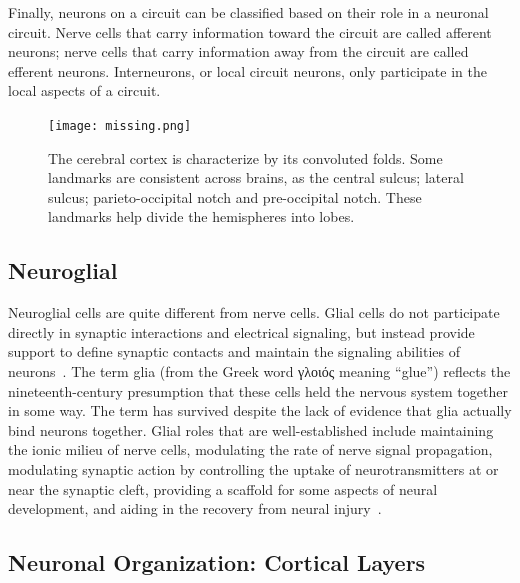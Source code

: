 Finally, neurons on a circuit can be classified based on their role in a 
neuronal circuit. Nerve cells that carry information toward the circuit are
called afferent neurons; nerve cells that carry information away from the 
circuit are called efferent neurons. Interneurons, or local circuit neurons,
only participate in the local aspects of a circuit.


\begin{figure}[t]
    \texttt{[image: missing.png]}
    \caption{The cerebral cortex is characterize by its convoluted folds.
             Some landmarks are consistent across brains, as the central sulcus;
             lateral sulcus; parieto-occipital notch and pre-occipital notch.
             These landmarks help divide the hemispheres into lobes.}
    \label{fig:cortex_anatomy}
\end{figure}

\subsection{Neuroglial}
Neuroglial cells are quite different from nerve cells. Glial cells do not
participate directly in synaptic interactions and electrical signaling, but
instead provide support to define synaptic contacts and maintain the signaling
abilities of neurons~\cite{Purves2004}. The term glia (from the Greek word
γλοιός meaning “glue”) reflects the nineteenth-century presumption that these
cells held the nervous system together in some way. The term has survived 
despite the lack of evidence that glia actually bind neurons together. Glial
roles that are well-established include maintaining the ionic milieu of nerve
cells, modulating the rate of nerve signal propagation, modulating synaptic
action by controlling the uptake of neurotransmitters at or near the synaptic
cleft, providing a scaffold for some aspects of neural development, and aiding
in the recovery from neural injury~\cite{Purves2004}.

\subsection{Neuronal Organization: Cortical Layers}


